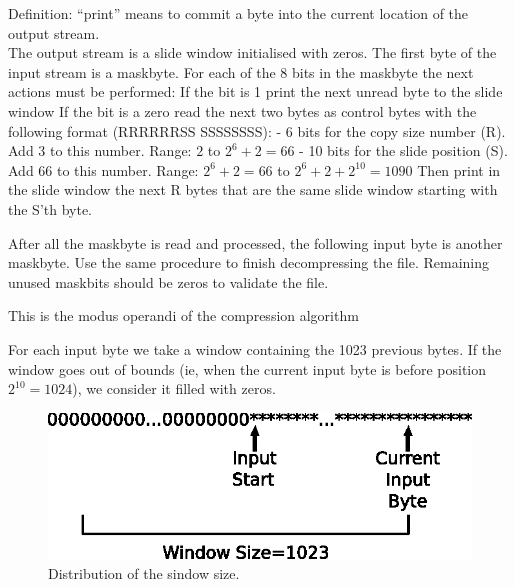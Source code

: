 \documentclass{article}
\begin{document}
 Definition: ``print'' means to commit a byte into the current location
             of the output stream.\\

 The output stream is a slide window initialised with zeros.
 The first byte of the input stream is a maskbyte.
 For each of the 8 bits in the maskbyte the next actions must be performed:
  If the bit is 1 print the next unread byte to the slide window
  If the bit is a zero read the next two bytes as control bytes with the
  following format (RRRRRRSS SSSSSSSS):
   - 6  bits for the copy size number (R). Add 3 to this number.
        Range: $2$ to $2^6+2=66$
   - 10 bits for the slide position (S). Add 66 to this number.
        Range: $2^6+2=66$ to $2^6+2+2^{10}=1090$
   Then print in the slide window the next R bytes that are the same slide
   window starting with the S'th byte.

 After all the maskbyte is read and processed, the following input byte is
 another maskbyte. Use the same procedure to finish decompressing the file.
 Remaining unused maskbits should be zeros to validate the file.

 This is the modus operandi of the compression algorithm

 For each input byte we take a window containing the 1023 previous bytes.
 If the window goes out of bounds (ie, when the current input byte is
 before position $2^{10}=1024$), we consider it filled with zeros.

\begin{figure}[h]
\centerline{\includegraphics{lzg.eps}}
\caption{Distribution of the sindow size.}
\end{figure}
\end{document}
